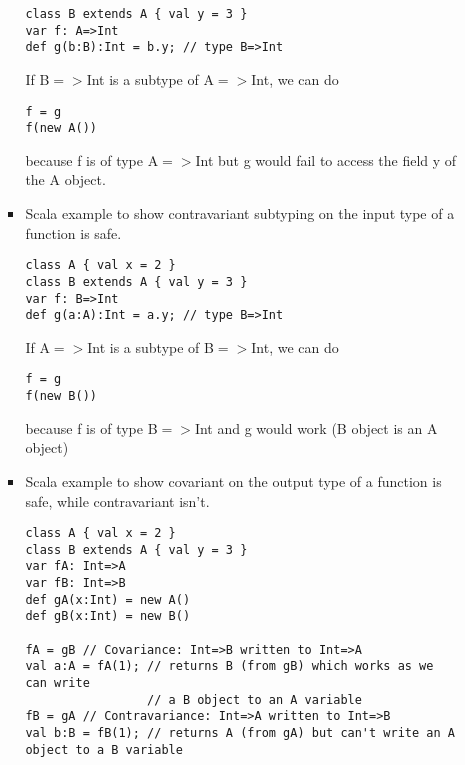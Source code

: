 \documentclass[10pt]{article}
\begin{document}
\begin{enumerate}
\begin{enumerate}
\begin{itemize}
\begin{verbatim}
class B extends A { val y = 3 }
var f: A=>Int
def g(b:B):Int = b.y; // type B=>Int
                \end{verbatim}
                If B$=>$Int is a subtype of A$=>$Int, we can do
                \begin{verbatim}
f = g
f(new A())
                \end{verbatim}
                because f is of type A$=>$Int but g would fail to access the field y of the A object.
                \item Scala example to show contravariant subtyping on the input type of a function is safe.
                \begin{verbatim}
class A { val x = 2 }
class B extends A { val y = 3 }
var f: B=>Int
def g(a:A):Int = a.y; // type B=>Int
                \end{verbatim}
                If A$=>$Int is a subtype of B$=>$Int, we can do
                \begin{verbatim}
f = g
f(new B())
                \end{verbatim}
                because f is of type B$=>$Int and g would work (B object is an A object)
                \item Scala example to show covariant on the output type of a function is safe, while contravariant isn't.
                \begin{verbatim}
class A { val x = 2 }
class B extends A { val y = 3 }
var fA: Int=>A
var fB: Int=>B
def gA(x:Int) = new A()
def gB(x:Int) = new B()

fA = gB // Covariance: Int=>B written to Int=>A
val a:A = fA(1); // returns B (from gB) which works as we can write 
                 // a B object to an A variable
fB = gA // Contravariance: Int=>A written to Int=>B
val b:B = fB(1); // returns A (from gA) but can't write an A object to a B variable
                \end{verbatim}
            \end{itemize}
            

\end{enumerate}
\end{enumerate}
\end{document}
